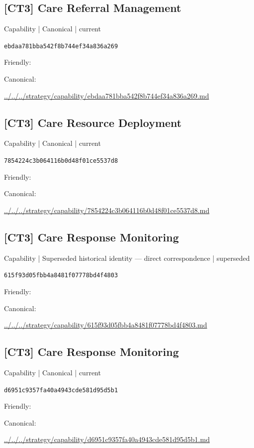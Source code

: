 \documentclass[10pt,a4paper]{article}
\begin{document}
\subsection*{[CT3] Care Referral Management}
{\small Capability | Canonical | current}\par
\texttt{ebdaa781bba542f8b744ef34a836a269}\par
Friendly: \par
Canonical: \par
{\footnotesize\url{../../../strategy/capability/ebdaa781bba542f8b744ef34a836a269.md}}\par
\subsection*{[CT3] Care Resource Deployment}
{\small Capability | Canonical | current}\par
\texttt{7854224c3b064116b0d48f01ce5537d8}\par
Friendly: \par
Canonical: \par
{\footnotesize\url{../../../strategy/capability/7854224c3b064116b0d48f01ce5537d8.md}}\par
\subsection*{[CT3] Care Response Monitoring}
{\small Capability | Superseded historical identity — direct correspondence | superseded}\par
\texttt{615f93d05fbb4a8481f07778bd4f4803}\par
Friendly: \par
Canonical: \par
{\footnotesize\url{../../../strategy/capability/615f93d05fbb4a8481f07778bd4f4803.md}}\par
\subsection*{[CT3] Care Response Monitoring}
{\small Capability | Canonical | current}\par
\texttt{d6951c9357fa40a4943cde581d95d5b1}\par
Friendly: \par
Canonical: \par
{\footnotesize\url{../../../strategy/capability/d6951c9357fa40a4943cde581d95d5b1.md}}\par
\end{document}
